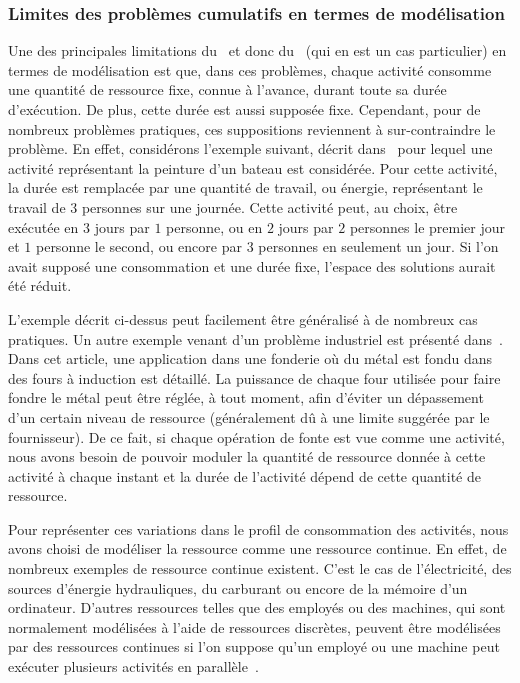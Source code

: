 \subsubsection{Limites des problèmes cumulatifs en termes de modélisation}
\label{sec:limit_CUSP}
Une des principales limitations du \RCPSP~et donc du \CUSP~(qui en est
un cas particulier) en termes de modélisation est que, dans ces
problèmes, chaque activité consomme une quantité de ressource fixe,
connue à l'avance, durant toute sa durée d'exécution. De plus, cette
durée est aussi supposée fixe. Cependant, pour de nombreux problèmes
pratiques, ces suppositions reviennent à sur-contraindre le
problème. En effet, considérons l'exemple suivant, décrit
dans~\cite{FT} pour lequel une activité représentant la
peinture d'un bateau est considérée. Pour cette activité, la durée est
remplacée par une quantité de travail, ou énergie, représentant le
travail de $3$ personnes sur une journée. Cette activité peut, au
choix, être exécutée en $3$ jours par $1$ personne, ou en $2$ jours
par $2$ personnes le premier jour et $1$ personne le second, ou encore
par $3$ personnes en seulement un jour. Si l'on avait supposé une
consommation et une durée fixe, l'espace des solutions aurait été
réduit.

L'exemple décrit ci-dessus peut facilement être généralisé à de
nombreux cas pratiques. Un autre exemple venant d'un problème
industriel est présenté dans~\cite{HaitArtiguesLopez}. Dans cet
article, une application dans une fonderie où du métal est fondu dans
des fours à induction est détaillé. La puissance de chaque four
utilisée pour faire fondre le métal peut être réglée, à tout moment,
afin d'éviter un dépassement d'un certain niveau de ressource
(généralement dû à une limite suggérée par le fournisseur). De ce
fait, si chaque opération de fonte est vue comme une activité, nous
avons besoin de pouvoir moduler la quantité de ressource donnée à
cette activité à chaque instant et la durée de l'activité dépend de
cette quantité de ressource.

Pour représenter ces variations dans le profil de consommation des
activités, nous avons choisi de modéliser la ressource comme une
ressource continue. En effet, de nombreux exemples de ressource
continue existent. C'est le cas de l'électricité, des sources
d'énergie hydrauliques, du carburant ou encore de la mémoire d'un
ordinateur. D'autres ressources telles que des employés ou des
machines, qui sont normalement modélisées à l'aide de ressources
discrètes, peuvent être modélisées par des ressources continues si
l'on suppose qu'un employé ou une machine peut exécuter plusieurs
activités en parallèle~\cite{W80,NK}.

